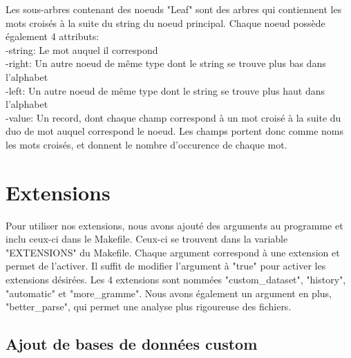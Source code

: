 \documentclass{article}
\begin{document}
Les sous-arbres contenant des noeuds "Leaf" sont des arbres qui contiennent les mots croisés à la suite du string du noeud principal. Chaque noeud possède également 4 attributs:\\
-string: Le mot auquel il correspond\\
-right:  Un autre noeud de même type dont le string se trouve plus bas dans l'alphabet\\
-left:  Un autre noeud de même type dont le string se trouve plus haut dans l'alphabet\\
-value: Un record, dont chaque champ correspond à un mot croisé à la suite du duo de mot auquel correspond le noeud. Les champs portent donc comme noms les mots croisés, et donnent le nombre d'occurence de chaque mot. \\


\section{Extensions}

Pour utiliser nos extensions, nous avons ajouté des arguments au programme et inclu ceux-ci dans le Makefile. Ceux-ci se trouvent dans la variable "EXTENSIONS" du Makefile. Chaque argument correspond à une extension et permet de l'activer. Il suffit de modifier l'argument à "true" pour activer les extensions désirées. Les 4 extensions sont nommées "custom\_dataset", "history", "automatic" et "more\_gramme". Nous avons également un argument en plus, "better\_parse", qui permet une analyse plus rigoureuse des fichiers.

\subsection{ Ajout de bases de données custom} 
\end{document}
